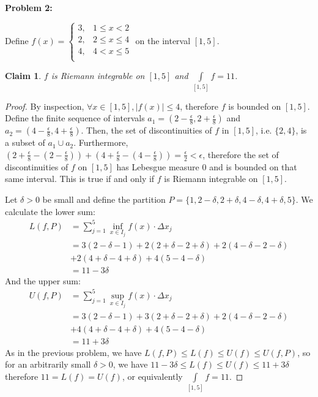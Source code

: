 \documentclass{article}
\newcommand{\eps}{\ensuremath{\epsilon}}
\newcommand{\infx}[1]{\ensuremath{\underset{#1}{\inf}}}
\newcommand{\supx}[1]{\ensuremath{\underset{#1}{\sup}}}
\newtheorem{clm}{Claim}
\begin{document}
\textbf{Problem 2:}

Define $f(x) = \begin{cases}
	3, & 1 \le x < 2 \\
	2, & 2 \le x \le 4 \\
	4, & 4 < x \le 5 \\
\end{cases}$ on the interval $[1,5]$.

\begin{clm}
	$f$ is Riemann integrable on $[1,5]$ and $\underset{[1,5]}{\int}f = 11$.
\end{clm}

\begin{proof}
	By inspection, $\forall x \in [1,5], |f(x)| \le 4$,
	therefore $f$ is bounded on $[1,5]$.
	Define the finite sequence of intervals
	$a_1 = (2-\frac{\eps}{8},2+\frac{\eps}{8})$
	and $a_2 = (4-\frac{\eps}{8}, 4+\frac{\eps}{8})$.
	Then, the set of discontinuities of $f$ in $[1,5]$,
	i.e. $\{2,4\}$, is a subset of $a_1 \cup a_2$.
	Furthermore, $(2+\frac{\eps}{8} - (2-\frac{\eps}{8})) + 
	(4+\frac{\eps}{8} - (4-\frac{\eps}{8})) = \frac{\eps}{2} < \eps$,
	therefore the set of discontinuities of $f$ on $[1,5]$
	has Lebesgue measure $0$ and is bounded on that same interval.
	This is true if and only if
	$f$ is Riemann integrable on $[1,5]$.
	
	Let $\delta > 0$ be small
	and define the partition
	$P = \{1, 2-\delta, 2+\delta,4-\delta,4+\delta,5\}$.
	We calculate the lower sum:
	\begin{align}
		L(f,P) & =\sum_{j=1}^5 \infx{x \in I_j} f(x) \cdot \Delta x_j \\
		       & = 3(2-\delta-1) + 2(2+\delta - 2+\delta) + 2(4-\delta-2-\delta) \nonumber \\
		       & + 2(4 + \delta - 4 + \delta) + 4(5-4-\delta) \\
		       & = 11-3\delta
	\end{align}
	And the upper sum:
	\begin{align}
		U(f,P) & =\sum_{j=1}^5 \supx{x \in I_j} f(x) \cdot \Delta x_j \\
		       & = 3(2-\delta-1) + 3(2+\delta - 2+\delta) + 2(4-\delta-2-\delta) \nonumber \\
		       & + 4(4 + \delta - 4 + \delta) + 4(5-4-\delta) \\
		       & = 11+3\delta
	\end{align}
	As in the previous problem,
	we have $L(f,P) \le L(f) \le U(f) \le U(f,P)$,
	so for an arbitrarily small $\delta > 0$, we have
	$11-3\delta \le L(f) \le U(f) \le 11 + 3\delta$
	therefore $11 = L(f) = U(f)$,
	or equivalently
	$\underset{[1,5]}{\int}f = 11$.
\end{proof}
\end{document}
